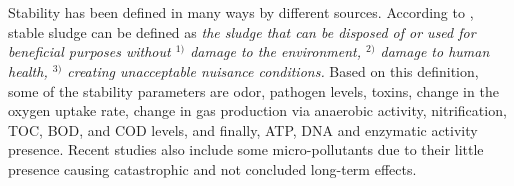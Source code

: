\documentclass[a4paper]{article}
\begin{document}
\section{} %
Stability has been defined in many ways by different sources\autocite{sanin2011}. According to \cite{sanin2011}, stable sludge can be defined as \textit{the sludge that can be disposed of or used for beneficial purposes without $^{1)}$ damage to the environment, $^{2)}$ damage to human health, $^{3)}$ creating unacceptable nuisance conditions.} Based on this definition, some of the stability parameters are odor, pathogen levels, toxins, change in the oxygen uptake rate, change in gas production via anaerobic activity, nitrification, TOC, BOD, and COD levels, and finally, ATP, DNA and enzymatic activity presence\autocite{sanin2011, vesilind1988}. Recent studies also include some micro-pollutants due to their little presence causing catastrophic and not concluded long-term effects.
\end{document}
